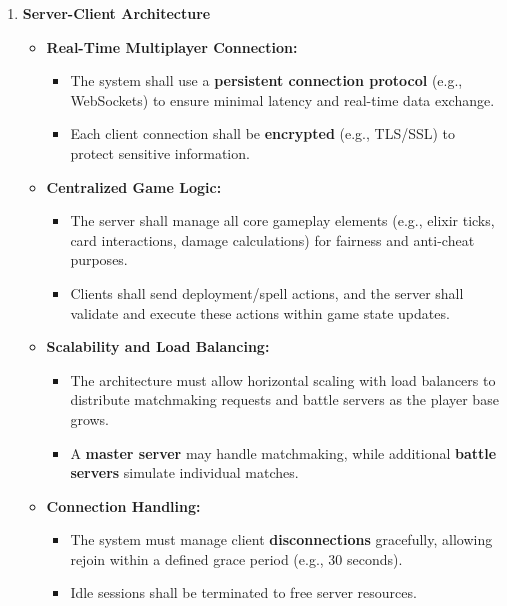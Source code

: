 \documentclass{article}
\begin{document}
\begin{enumerate}[label=\textbf{FR\arabic*.}]

\item \textbf{Server-Client Architecture}
\begin{itemize}
    \item \textbf{Real-Time Multiplayer Connection:}
    \begin{itemize}
        \item The system shall use a \textbf{persistent connection protocol} (e.g., WebSockets) to ensure minimal latency and real-time data exchange.
        \item Each client connection shall be \textbf{encrypted} (e.g., TLS/SSL) to protect sensitive information.
    \end{itemize}
    \item \textbf{Centralized Game Logic:}
    \begin{itemize}
        \item The server shall manage all core gameplay elements (e.g., elixir ticks, card interactions, damage calculations) for fairness and anti-cheat purposes.
        \item Clients shall send deployment/spell actions, and the server shall validate and execute these actions within game state updates.
    \end{itemize}
    \item \textbf{Scalability and Load Balancing:}
    \begin{itemize}
        \item The architecture must allow horizontal scaling with load balancers to distribute matchmaking requests and battle servers as the player base grows.
        \item A \textbf{master server} may handle matchmaking, while additional \textbf{battle servers} simulate individual matches.
    \end{itemize}
    \item \textbf{Connection Handling:}
    \begin{itemize}
        \item The system must manage client \textbf{disconnections} gracefully, allowing rejoin within a defined grace period (e.g., 30 seconds).
        \item Idle sessions shall be terminated to free server resources.
    \end{itemize}
\end{itemize}


\end{enumerate}
\end{document}
